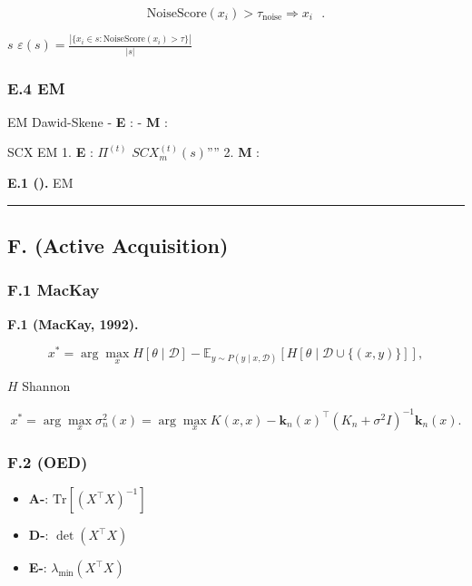\documentclass[
  12pt,
]{article}
\providecommand{\tightlist}{%
  \setlength{\itemsep}{0pt}\setlength{\parskip}{0pt}}
\begin{document}
\[\text{NoiseScore}(x_i) > \tau_{\text{noise}} \Rightarrow x_i \text{ }.\]

 \(s\) 
\(\varepsilon(s) = \frac{|\{x_i \in s: \text{NoiseScore}(x_i) > \tau\}|}{|s|}\)

\subsubsection{E.4  EM
}\label{e.4-ux4e0e-em-ux7b97ux6cd5ux5728ux4f17ux5305ux5b66ux4e60ux4e2dux7684ux5173ux7cfb}

EM Dawid-Skene - \textbf{E }:
 - \textbf{M }:


SCX  EM  1. \textbf{ E }:
 \(\Pi^{(t)}\) 
\(SCX_m^{(t)}(s)\)'''' 2. \textbf{ M }:


\textbf{ E.1 ().} 
EM 

\begin{center}\rule{0.5\linewidth}{0.5pt}\end{center}

\subsection{F.  (Active
Acquisition)}\label{f.-ux4e3bux52a8ux91c7ux6837-active-acquisition}

\subsubsection{F.1 MacKay
}\label{f.1-mackay-ux4fe1ux606fux8bbaux4e3bux52a8ux5b66ux4e60}

\textbf{ F.1 (MacKay, 1992).} 

\[x^* = \arg\max_x H[\theta \mid \mathcal{D}] - \mathbb{E}_{y \sim P(y \mid x, \mathcal{D})}[H[\theta \mid \mathcal{D} \cup \{(x, y)\}]],\]

 \(H\)  Shannon 



\[x^* = \arg\max_x \sigma^2_{n}(x) = \arg\max_x K(x, x) - \mathbf{k}_n(x)^\top (K_n + \sigma^2 I)^{-1} \mathbf{k}_n(x).\]

\subsubsection{F.2  (OED)
}\label{f.2-ux4e0eux6700ux4f18ux5b9eux9a8cux8bbeux8ba1-oed-ux7684ux5173ux7cfb}



\begin{itemize}
\tightlist
\item
  \textbf{A-}: 
  \(\text{Tr}[(X^\top X)^{-1}]\)
\item
  \textbf{D-}:  \(\det(X^\top X)\)
\item
  \textbf{E-}:  \(\lambda_{\min}(X^\top X)\)
\end{itemize}
\end{document}
